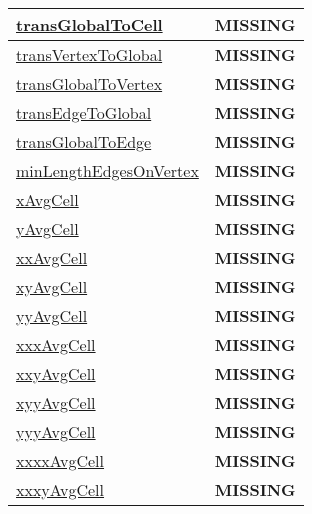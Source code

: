 {\begin{center}
\begin{longtable}{| p{2.0in} | p{4.0in} |}
    \hline
    \hyperref[subsec:var_sec_incremental_remap_transGlobalToCell]{transGlobalToCell} & {\bf \color{red} MISSING} \\
    \hline
    \hyperref[subsec:var_sec_incremental_remap_transVertexToGlobal]{transVertexToGlobal} & {\bf \color{red} MISSING} \\
    \hline
    \hyperref[subsec:var_sec_incremental_remap_transGlobalToVertex]{transGlobalToVertex} & {\bf \color{red} MISSING} \\
    \hline
    \hyperref[subsec:var_sec_incremental_remap_transEdgeToGlobal]{transEdgeToGlobal} & {\bf \color{red} MISSING} \\
    \hline
    \hyperref[subsec:var_sec_incremental_remap_transGlobalToEdge]{transGlobalToEdge} & {\bf \color{red} MISSING} \\
    \hline
    \hyperref[subsec:var_sec_incremental_remap_minLengthEdgesOnVertex]{minLengthEdgesOnVertex} & {\bf \color{red} MISSING} \\
    \hline
    \hyperref[subsec:var_sec_incremental_remap_xAvgCell]{xAvgCell} & {\bf \color{red} MISSING} \\
    \hline
    \hyperref[subsec:var_sec_incremental_remap_yAvgCell]{yAvgCell} & {\bf \color{red} MISSING} \\
    \hline
    \hyperref[subsec:var_sec_incremental_remap_xxAvgCell]{xxAvgCell} & {\bf \color{red} MISSING} \\
    \hline
    \hyperref[subsec:var_sec_incremental_remap_xyAvgCell]{xyAvgCell} & {\bf \color{red} MISSING} \\
    \hline
    \hyperref[subsec:var_sec_incremental_remap_yyAvgCell]{yyAvgCell} & {\bf \color{red} MISSING} \\
    \hline
    \hyperref[subsec:var_sec_incremental_remap_xxxAvgCell]{xxxAvgCell} & {\bf \color{red} MISSING} \\
    \hline
    \hyperref[subsec:var_sec_incremental_remap_xxyAvgCell]{xxyAvgCell} & {\bf \color{red} MISSING} \\
    \hline
    \hyperref[subsec:var_sec_incremental_remap_xyyAvgCell]{xyyAvgCell} & {\bf \color{red} MISSING} \\
    \hline
    \hyperref[subsec:var_sec_incremental_remap_yyyAvgCell]{yyyAvgCell} & {\bf \color{red} MISSING} \\
    \hline
    \hyperref[subsec:var_sec_incremental_remap_xxxxAvgCell]{xxxxAvgCell} & {\bf \color{red} MISSING} \\
    \hline
    \hyperref[subsec:var_sec_incremental_remap_xxxyAvgCell]{xxxyAvgCell} & {\bf \color{red} MISSING} \\

\end{longtable}
\end{center}}
